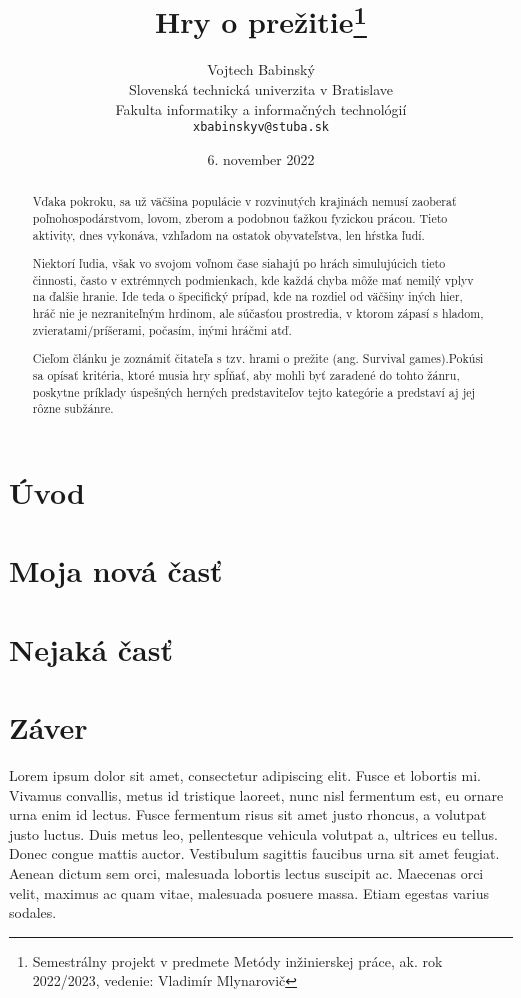 \documentclass[10pt,twoside,slovak,a4paper]{article}
\title{Hry o prežitie\thanks{Semestrálny projekt v predmete Metódy inžinierskej práce, ak. rok 2022/2023, vedenie: Vladimír Mlynarovič}} %
\author{Vojtech Babinský\\[2pt]
	{\small Slovenská technická univerzita v Bratislave}\\
	{\small Fakulta informatiky a informačných technológií}\\
	{\small \texttt{xbabinskyv@stuba.sk}}
	}
\date{\small 6. november 2022} %
\begin{document}
\maketitle

\begin{abstract}

Vďaka pokroku, sa už väčšina populácie v rozvinutých krajinách nemusí zaoberať poľnohospodárstvom, lovom, zberom a podobnou ťažkou fyzickou prácou. Tieto aktivity, dnes vykonáva, vzhľadom na ostatok obyvateľstva, len hŕstka ľudí. 

Niektorí ľudia, však vo svojom voľnom čase siahajú po hrách simulujúcich tieto činnosti, často v extrémnych podmienkach, kde každá chyba môže mať nemilý vplyv na ďalšie hranie. Ide teda o špecifický prípad, kde na rozdiel od väčšiny iných hier, hráč nie je nezraniteľným hrdinom, ale súčasťou prostredia, v ktorom zápasí s hladom, zvieratami/príšerami, počasím, inými hráčmi atď. 

Cieľom článku je zoznámiť čitateľa s tzv. hrami o prežite (ang. Survival games).Pokúsi sa opísať kritéria, ktoré musia hry spĺňať, aby mohli byť zaradené do tohto žánru, poskytne príklady  úspešných herných predstaviteľov tejto kategórie a predstaví aj jej rôzne subžánre. 
\end{abstract}


\newpage


\section{Úvod}



\section{Moja nová časť}
\cite{Toppo}

\cite{IGN}

\section{Nejaká časť} \label{nejaka}

\cite{Reid}








\section{Záver} \label{zaver} %
Lorem ipsum dolor sit amet, consectetur adipiscing elit. Fusce et lobortis mi. Vivamus convallis, metus id tristique laoreet, nunc nisl fermentum est, eu ornare urna enim id lectus. Fusce fermentum risus sit amet justo rhoncus, a volutpat justo luctus. Duis metus leo, pellentesque vehicula volutpat a, ultrices eu tellus. Donec congue mattis auctor. Vestibulum sagittis faucibus urna sit amet feugiat. Aenean dictum sem orci, malesuada lobortis lectus suscipit ac. Maecenas orci velit, maximus ac quam vitae, malesuada posuere massa. Etiam egestas varius sodales.
\end{document}
